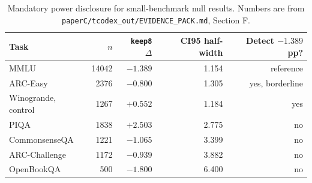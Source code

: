 \begin{table}[t]
\centering
\small
\setlength{\tabcolsep}{4.5pt}
\begin{tabular}{lrrrr}
\toprule
Task & $n$ & \texttt{keep8} $\Delta$ & CI95 half-width & Detect $-1.389$ pp? \\
\midrule
MMLU & 14042 & $-1.389$ & 1.154 & reference \\
ARC-Easy & 2376 & $-0.800$ & 1.305 & yes, borderline \\
Winogrande, control & 1267 & $+0.552$ & 1.184 & yes \\
PIQA & 1838 & $+2.503$ & 2.775 & no \\
CommonsenseQA & 1221 & $-1.065$ & 3.399 & no \\
ARC-Challenge & 1172 & $-0.939$ & 3.882 & no \\
OpenBookQA & 500 & $-1.800$ & 6.400 & no \\
\bottomrule
\end{tabular}
\caption{Mandatory power disclosure for small-benchmark null results. Numbers are from \texttt{paperC/tcodex\_out/EVIDENCE\_PACK.md}, Section F.}
\label{tab:power}
\end{table}
